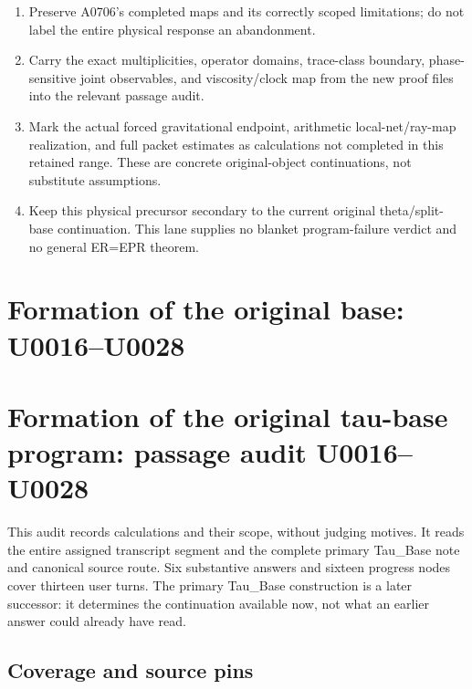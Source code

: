 \begin{enumerate}
\def\labelenumi{\arabic{enumi}.}
\tightlist
\item
  Preserve A0706's completed maps and its correctly scoped limitations;
  do not label the entire physical response an abandonment.
\item
  Carry the exact multiplicities, operator domains, trace-class
  boundary, phase-sensitive joint observables, and viscosity/clock map
  from the new proof files into the relevant passage audit.
\item
  Mark the actual forced gravitational endpoint, arithmetic
  local-net/ray-map realization, and full packet estimates as
  calculations not completed in this retained range. These are concrete
  original-object continuations, not substitute assumptions.
\item
  Keep this physical precursor secondary to the current original
  theta/split-base continuation. This lane supplies no blanket
  program-failure verdict and no general ER=EPR theorem.
\end{enumerate}

\clearpage

\section{Formation of the original base:
U0016--U0028}\label{TranscriptLedgerStage:formation-of-the-original-base-u0016u0028}

\section{Formation of the original tau-base program: passage audit
U0016--U0028}\label{TranscriptLedgerStage:formation-of-the-original-tau-base-program-passage-audit-u0016u0028}

This audit records calculations and their scope, without judging
motives. It reads the entire assigned transcript segment and the
complete primary Tau\_Base note and canonical source route. Six
substantive answers and sixteen progress nodes cover thirteen user
turns. The primary Tau\_Base construction is a later successor: it
determines the continuation available now, not what an earlier answer
could already have read.

\subsection{Coverage and source pins}\label{TranscriptLedgerStage:coverage-and-source-pins}

